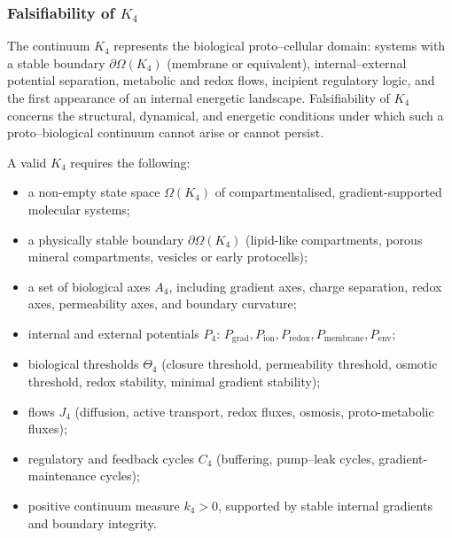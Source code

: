 
\subsubsection{Falsifiability of \texorpdfstring{$K_4$}{K_4}}
\label{sec:falsifiability-k4}

The continuum $K_4$ represents the biological proto–cellular domain:
systems with a stable boundary $\partial\Omega(K_4)$ (membrane or equivalent),
internal–external potential separation, metabolic and redox flows,
incipient regulatory logic, and the first appearance of an internal
energetic landscape.
Falsifiability of $K_4$ concerns the structural, dynamical, and
energetic conditions under which such a proto–biological continuum
cannot arise or cannot persist.

A valid $K_4$ requires the following:
\begin{itemize}
    \item a non-empty state space $\Omega(K_4)$ of compartmentalised,
          gradient-supported molecular systems;
    \item a physically stable boundary $\partial\Omega(K_4)$
          (lipid-like compartments, porous mineral compartments,
          vesicles or early protocells);
    \item a set of biological axes $A_4$, including gradient axes,
          charge separation, redox axes, permeability axes,
          and boundary curvature;
    \item internal and external potentials $P_4$:
          $P_{\mathrm{grad}}, P_{\mathrm{ion}}, P_{\mathrm{redox}},
           P_{\mathrm{membrane}}, P_{\mathrm{env}}$;
    \item biological thresholds $\Theta_4$ (closure threshold,
          permeability threshold, osmotic threshold,
          redox stability, minimal gradient stability);
    \item flows $J_4$ (diffusion, active transport, redox fluxes,
          osmosis, proto-metabolic fluxes);
    \item regulatory and feedback cycles $C_4$ (buffering,
          pump–leak cycles, gradient-maintenance cycles);
    \item positive continuum measure $k_4>0$, supported by
          stable internal gradients and boundary integrity.
\end{itemize}

